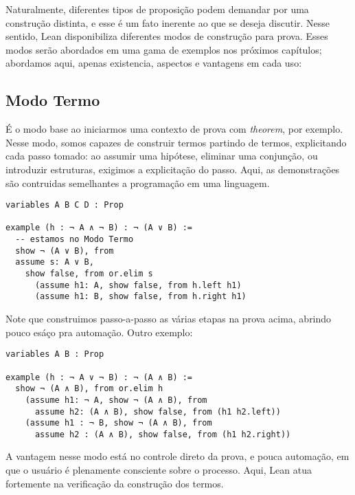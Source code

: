 \vspace{5mm}

Naturalmente, diferentes tipos de proposição podem demandar por uma construção distinta, e esse é um fato inerente ao que se deseja discutir. Nesse sentido, Lean disponibiliza diferentes modos de construção para prova. Esses modos serão abordados em uma gama de exemplos nos próximos capítulos; abordamos aqui, apenas existencia, aspectos e vantagens em cada uso:

\subsection{Modo Termo}
É o modo base ao iniciarmos uma contexto de prova com \textit{theorem}, por exemplo. Nesse modo, somos capazes de construir termos partindo de termos, explicitando cada passo tomado: ao assumir uma hipótese, eliminar uma conjunção, ou introduzir estruturas, exigimos a explicitação do passo. Aqui, as demonstrações são contruidas semelhantes a programação em uma linguagem.

\vspace{5mm}
\begin{lstlisting}
variables A B C D : Prop

example (h : ¬ A ∧ ¬ B) : ¬ (A ∨ B) :=
  -- estamos no Modo Termo
  show ¬ (A ∨ B), from
  assume s: A ∨ B,
    show false, from or.elim s
      (assume h1: A, show false, from h.left h1)
      (assume h1: B, show false, from h.right h1)
\end{lstlisting}
\vspace{5mm}

\noindent Note que construimos passo-a-passo as várias etapas na prova acima, abrindo pouco esáço pra automação. Outro exemplo:

\vspace{5mm}
\begin{lstlisting}
variables A B : Prop

example (h : ¬ A ∨ ¬ B) : ¬ (A ∧ B) :=
  show ¬ (A ∧ B), from or.elim h
    (assume h1: ¬ A, show ¬ (A ∧ B), from
      assume h2: (A ∧ B), show false, from (h1 h2.left))
    (assume h1 : ¬ B, show ¬ (A ∧ B), from
      assume h2 : (A ∧ B), show false, from (h1 h2.right))
\end{lstlisting}
\vspace{5mm}

\noindent A vantagem nesse modo está no controle direto da prova, e pouca automação, em que o usuário é plenamente consciente sobre o processo. Aqui, Lean atua fortemente na verificação da construção dos termos.

